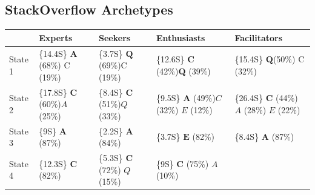 

\subsection{StackOverflow Archetypes}
\label{sec:stack}
\begin{table}[!h]
	\centering
	\begin{tabular}{p{30mm} p{25mm} p{25mm} p{25mm} p{25mm}@{}}
		\toprule
		  & Experts & Seekers & Enthusiasts & Facilitators \\
		\midrule
		State 1& \{14.4S\} \newline $\mathbf{A}$ (68\%) \newline C (19\%) &
		\{3.7S\} \newline $\mathbf{Q}$ (69\%)\newline C (19\%)&
		\{12.6S\} \newline $\mathbf{C}$ (42\%)\newline \textbf{Q} (39\%) &
		\{15.4S\} \newline $\mathbf{Q}$(50\%) \newline C (32\%) \\
		State 2 &  \{17.8S\} \newline \textbf{C} (60\%)\newline ${A}$ (25\%) &
		\{8.4S\} \newline \textbf{C} (51\%)\newline ${Q}$ (33\%) &
		\{9.5S\} \newline \textbf{A} (49\%)\newline ${C}$ (32\%) \newline ${E}$ (12\%)&
		\{26.4S\} \newline \textbf{C} (44\%) \newline ${A}$ (28\%) \newline ${E}$ (22\%)\\
		State 3 & \{9S\} \newline $\mathbf{A}$ (87\%)  &
		\{2.2S\} \newline $\mathbf{A}$ (84\%) &
		\{3.7S\} \newline $\mathbf{E}$ (82\%) &
		\{8.4S\} \newline $\mathbf{A}$ (87\%)  \\
		State 4 & \{12.3S\} \newline $\mathbf{C}$ (82\%)  &
		\{5.3S\} \newline $\mathbf{C}$ (72\%) \newline ${Q}$ (15\%) &
		\{9S\} \newline $\mathbf{C}$ (75\%) \newline $A$ (10\%)  &

\end{tabular}
\end{table}
